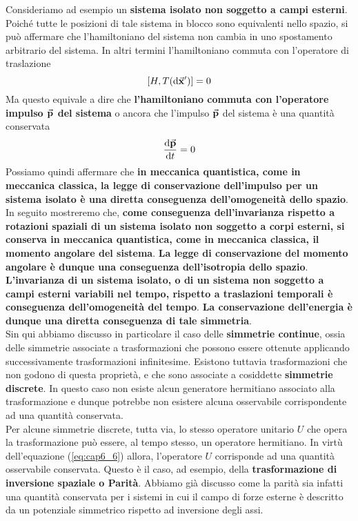 \documentclass[a4paper,12pt,oneside]{book}
\begin{document}
Consideriamo ad esempio un \textbf{sistema isolato non soggetto a campi esterni}. Poiché tutte le posizioni di tale sistema in blocco sono equivalenti nello spazio, si può affermare che l'hamiltoniano del sistema non cambia in uno spostamento arbitrario del sistema. In altri termini l'hamiltoniano commuta con l'operatore di traslazione
\begin{equation}
  \comm{H}{T\qty(\dd\va{x}')} = 0
\end{equation}
Ma questo equivale a dire che \textbf{l'hamiltoniano commuta con l'operatore impulso $\va{p}$ del sistema} o ancora che l'impulso $\va{p}$ del sistema è una quantità conservata
\begin{equation}
  \dv{\va{p}}{t} = 0
\end{equation}
Possiamo quindi affermare che \textbf{in meccanica quantistica, come in meccanica classica, la legge di conservazione dell'impulso per un sistema isolato è una diretta conseguenza dell'omogeneità dello spazio}.
In seguito mostreremo che, \textbf{come conseguenza dell'invarianza rispetto a rotazioni spaziali di un sistema isolato non soggetto a corpi esterni, si conserva in meccanica quantistica, come in meccanica classica, il momento angolare del sistema}. \textbf{La legge di conservazione del momento angolare è dunque una conseguenza dell'isotropia dello spazio}.\\
\textbf{L'invarianza di un sistema isolato, o di un sistema non soggetto a campi esterni variabili nel tempo, rispetto a traslazioni temporali è conseguenza dell'omogeneità del tempo}. \textbf{La conservazione dell'energia è dunque una diretta conseguenza di tale simmetria}.\\
Sin qui abbiamo discusso in particolare il caso delle \textbf{simmetrie continue}, ossia delle simmetrie associate a trasformazioni che possono essere ottenute applicando successivamente trasformazioni infinitesime. Esistono tuttavia trasformazioni che non godono di questa proprietà, e che sono associate a cosiddette \textbf{simmetrie discrete}. In questo caso non esiste alcun generatore hermitiano associato alla trasformazione e dunque potrebbe non esistere alcuna osservabile corrispondente ad una quantità conservata.\\

Per alcune simmetrie discrete, tutta via, lo stesso operatore unitario $U$ che opera la trasformazione può essere, al tempo stesso, un operatore hermitiano. In virtù dell'equazione (\ref{eq:cap6_6}) allora, l'operatore $U$ corrisponde ad una quantità osservabile conservata. Questo è il caso, ad esempio, della \textbf{trasformazione di inversione spaziale o Parità}. Abbiamo già discusso come la parità sia infatti una quantità conservata per i sistemi in cui il campo di forze esterne è descritto da un potenziale simmetrico rispetto ad inversione degli assi.
\end{document}
